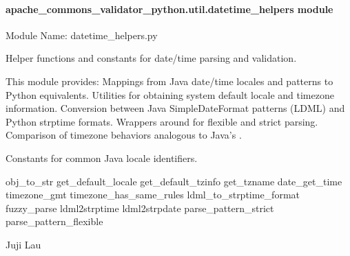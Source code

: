 \documentclass[letterpaper,10pt,english]{sphinxmanual}
\begin{document}
\paragraph{apache\_commons\_validator\_python.util.datetime\_helpers module}
\label{\detokenize{apache_commons_validator_python.util:module-apache_commons_validator_python.util.datetime_helpers}}\label{\detokenize{apache_commons_validator_python.util:apache-commons-validator-python-util-datetime-helpers-module}}
\sphinxAtStartPar
Module Name: datetime\_helpers.py
\begin{description}
\sphinxAtStartPar
Helper functions and constants for date/time parsing and validation.

\end{description}

\sphinxAtStartPar
This module provides:
\sphinxhyphen{} Mappings from Java date/time locales and patterns to Python equivalents.
\sphinxhyphen{} Utilities for obtaining system default locale and timezone information.
\sphinxhyphen{} Conversion between Java SimpleDateFormat patterns (LDML) and Python strptime formats.
\sphinxhyphen{} Wrappers around  for flexible and strict parsing.
\sphinxhyphen{} Comparison of timezone behaviors analogous to Java’s .
\begin{description}
\begin{description}
\sphinxAtStartPar
Constants for common Java locale identifiers.

\end{description}

\sphinxAtStartPar
obj\_to\_str
get\_default\_locale
get\_default\_tzinfo
get\_tzname
date\_get\_time
timezone\_gmt
timezone\_has\_same\_rules
ldml\_to\_strptime\_format
fuzzy\_parse
ldml2strptime
ldml2strpdate
parse\_pattern\_strict
parse\_pattern\_flexible

\sphinxAtStartPar
Juji Lau

\end{description}
\end{document}
